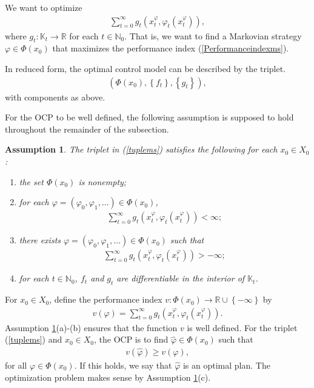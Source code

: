 \documentclass[3p]{elsarticle}
\newcommand{\rz}{\mathbb R}
\newcommand{\nat}{\mathbb N_0}
\newtheorem{assu}[thm]{Assumption}
\begin{document}
	
	
	
	
	
	
	
	
	
	
	
	
	
	
	We want to optimize 
	\begin{align}\label{Performanceindexms}
	\sum_{t=0}^{\infty}g_t(x_t^\varphi,\varphi_t(x_t^\varphi)),
	\end{align}
	where $g_t:\mathbb K_t\to\rz$ for each $t\in\nat$.  That is, we want to find a Markovian strategy $\varphi\in\varPhi(x_0)$ that maximizes the performance index (\ref{Performanceindexms}). 
	
	In reduced form, the optimal control model can be described by the triplet.
	\begin{align}\label{tuplems}
	(\varPhi(x_0), \left\lbrace f_t\right\rbrace, \left\lbrace g_t\right\rbrace),
	\end{align} 
	with components as above. 
	
	For the OCP to be well defined, the following assumption is supposed to hold throughout the remainder of the subsection.
	
	
	\begin{assu}\label{WellPosedms}
		The triplet in (\ref{tuplems}) satisfies the following for each $x_0\in X_0$:
		\begin{enumerate}
			\item[(a)] the set $\varPhi(x_0)$ is nonempty;
			
			\item[(b)] for each $\varphi=(\varphi_0,\varphi_1,\dots)\in\varPhi(x_0)$, 
			\begin{align*}
			\sum_{t=0}^\infty g_t(x_t^\varphi,\varphi_t(x_t^\varphi))<\infty;
			\end{align*}
			\item[(c)] there exists  $\varphi=(\varphi_0,\varphi_1,\dots)\in\varPhi(x_0)$ such that 
			\begin{align*}
			\sum_{t=0}^\infty g_t(x_t^\varphi,\varphi_t(x_t^\varphi))>-\infty;
			\end{align*}
			\item[(d)] for each $t\in\nat$, $f_t$ and $g_t$ are differentiable in the interior of $\mathbb K_t$.
		\end{enumerate}
	\end{assu}
	For $x_0\in X_0$, define the performance index $v:\varPhi(x_0)\to\mathbb R\cup\left\lbrace -\infty\right\rbrace $ by
	\begin{align}\label{PIms}
	v(\varphi)=\sum_{t=0}^\infty g_t(x_t^\varphi,\varphi_t(x_t^\varphi)).
	\end{align}
	Assumption \ref{WellPosedms}(a)-(b) ensures that the function $v$  is well defined. For the triplet (\ref{tuplems}) and $x_0\in X_0$, the OCP is to find $\hat\varphi\in\varPhi(x_0)$ such that 
	\begin{align*}
	v(\hat{\varphi})\ge v(\varphi),
	\end{align*} 
	for all $\varphi\in\varPhi(x_0)$. If this holds, we say that $\hat{\varphi}$ is an optimal plan. The optimization problem makes sense by  Assumption \ref{WellPosedms}(c).
	
\end{document}
